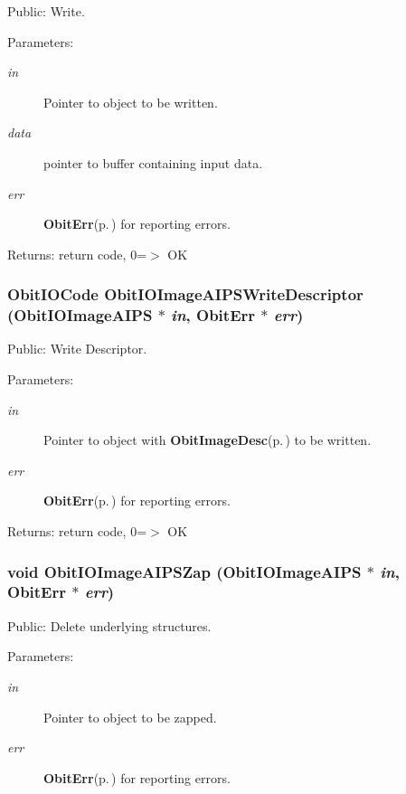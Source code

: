 Public: Write. 

\begin{Desc}
\item[Parameters:]
\begin{description}
\item[{\em in}]Pointer to object to be written. \item[{\em data}]pointer to buffer containing input data. \item[{\em err}]{\bf Obit\-Err}{\rm (p.\,\pageref{structObitErr})} for reporting errors. \end{description}
\end{Desc}
\begin{Desc}
\item[Returns:]return code, 0=$>$ OK \end{Desc}
\subsubsection{\setlength{\rightskip}{0pt plus 5cm}Obit\-IOCode Obit\-IOImage\-AIPSWrite\-Descriptor ({\bf Obit\-IOImage\-AIPS} $\ast$ {\em in}, {\bf Obit\-Err} $\ast$ {\em err})}\label{ObitIOImageAIPS_8c_a18}


Public: Write Descriptor. 

\begin{Desc}
\item[Parameters:]
\begin{description}
\item[{\em in}]Pointer to object with {\bf Obit\-Image\-Desc}{\rm (p.\,\pageref{structObitImageDesc})} to be written. \item[{\em err}]{\bf Obit\-Err}{\rm (p.\,\pageref{structObitErr})} for reporting errors. \end{description}
\end{Desc}
\begin{Desc}
\item[Returns:]return code, 0=$>$ OK \end{Desc}
\subsubsection{\setlength{\rightskip}{0pt plus 5cm}void Obit\-IOImage\-AIPSZap ({\bf Obit\-IOImage\-AIPS} $\ast$ {\em in}, {\bf Obit\-Err} $\ast$ {\em err})}\label{ObitIOImageAIPS_8c_a10}


Public: Delete underlying structures. 

\begin{Desc}
\item[Parameters:]
\begin{description}
\item[{\em in}]Pointer to object to be zapped. \item[{\em err}]{\bf Obit\-Err}{\rm (p.\,\pageref{structObitErr})} for reporting errors. \end{description}
\end{Desc}
